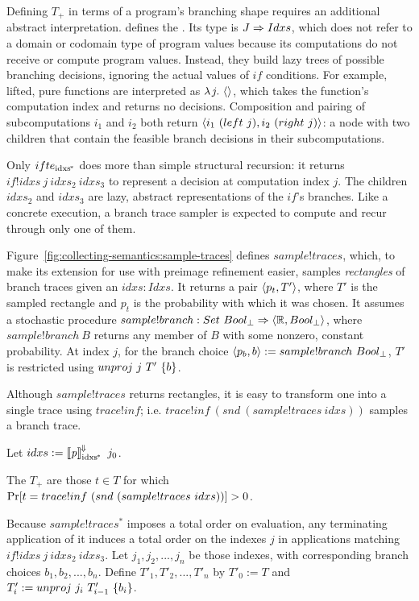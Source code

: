 Defining $T_+$ in terms of a program's branching shape requires an additional abstract interpretation.
 defines the .
Its type is $J \Rightarrow Idxs$, which does not refer to a domain or codomain type of program values because its computations do not receive or compute program values.
Instead, they build lazy trees of possible branching decisions, ignoring the actual values of $if$ conditions.
For example, lifted, pure functions are interpreted as $\lambda\mspace{2mu}{j}\ldotp\, \langle{}\rangle$, which takes the function's computation index and returns no decisions.
Composition and pairing of subcomputations $i_1$ and $i_2$ both return $\langle{i_1~(left~j),i_2~(right~j)}\rangle$: a node with two children that contain the feasible branch decisions in their subcomputations.

Only $ifte_\mathrm{idxs^{\mspace{-2mu}*}}$ does more than simple structural recursion: it returns $if!idxs~j~idxs_2~idxs_3$ to represent a decision at computation index $j$.
The children $idxs_2$ and $idxs_3$ are lazy, abstract representations of the $if$'s branches.
Like a concrete execution, a branch trace sampler is expected to compute and recur through only one of them.

Figure~\ref{fig:collecting-semantics:sample-traces} defines $sample!traces$, which, to make its extension for use with preimage refinement easier, samples \emph{rectangles} of branch traces given an $idxs : Idxs$.
It returns a pair $\langle{p_t,T'}\rangle$, where $T'$ is the sampled rectangle and $p_t$ is the probability with which it was chosen.
It assumes a stochastic procedure $sample!branch : Set~Bool_\bot \Rightarrow \langle{\mathbb{R},Bool_\bot}\rangle$, where $sample!branch~B$ returns any member of $B$ with some nonzero, constant probability.
At index $j$, for the branch choice $\langle{p_b,b}\rangle := sample!branch~Bool_\bot$, $T'$ is restricted using $unproj~j~T'~\{{b}\}$.

Although $sample!traces$ returns rectangles, it is easy to transform one into a single trace using $trace!inf$; i.e. $trace!inf~(snd~(sample!traces~idxs))$ samples a branch trace.

Let $idxs := \left\llbracket{\mathit{p}}\right\rrbracket^{\mspace{-2mu}\Downarrow\mspace{-2mu}}_\mathrm{idxs^{\mspace{-2mu}*}}~j_0$.

\begin{definition}
The  $T_+$ are those $t \in T$ for which $\mathrm{Pr}\!\left[{t = trace!inf~(snd~(sample!traces~idxs))}\right] > 0$.
\end{definition}

Because $sample!traces^*$ imposes a total order on evaluation, any terminating application of it induces a total order on the indexes $j$ in applications matching $if!idxs~j~idxs_2~idxs_3$.
Let $j_1, j_2, ..., j_n$ be those indexes, with corresponding branch choices $b_1,b_2,...,b_n$.
Define $T'_1,T'_2,...,T'_n$ by $T'_0 := T$ and $T'_i := unproj~j_i~T'_{i-1}~\{{b_i}\}$.

